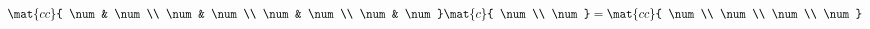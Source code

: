 \begin{equation}
  \mat{cc}{ \num & \num \\ \num & \num  \\ \num & \num \\  \num & \num }
  \mat{c} { \num \\ \num } =
  \mat{cc}{ \num \\ \num  \\ \num \\  \num }
\end{equation}


\endinput